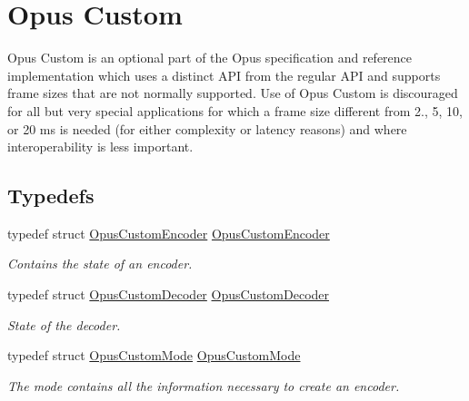 \hypertarget{group__opus__custom}{}\section{Opus Custom}
\label{group__opus__custom}


Opus Custom is an optional part of the Opus specification and reference implementation which uses a distinct A\+PI from the regular A\+PI and supports frame sizes that are not normally supported. Use of Opus Custom is discouraged for all but very special applications for which a frame size different from 2., 5, 10, or 20 ms is needed (for either complexity or latency reasons) and where interoperability is less important.  


\subsection*{Typedefs}
\begin{DoxyCompactItemize}
\item 
typedef struct \hyperlink{group__opus__custom_ga7abe6a7afc599667950251c987feb439}{Opus\+Custom\+Encoder} \hyperlink{group__opus__custom_ga7abe6a7afc599667950251c987feb439}{Opus\+Custom\+Encoder}
\begin{DoxyCompactList}\small\item\em Contains the state of an encoder. \end{DoxyCompactList}\item 
typedef struct \hyperlink{group__opus__custom_gacae60f89c5ce7aeea69503451b9e2e6f}{Opus\+Custom\+Decoder} \hyperlink{group__opus__custom_gacae60f89c5ce7aeea69503451b9e2e6f}{Opus\+Custom\+Decoder}
\begin{DoxyCompactList}\small\item\em State of the decoder. \end{DoxyCompactList}\item 
typedef struct \hyperlink{group__opus__custom_gaf33847c711195b9edef896b73c96ec4f}{Opus\+Custom\+Mode} \hyperlink{group__opus__custom_gaf33847c711195b9edef896b73c96ec4f}{Opus\+Custom\+Mode}
\begin{DoxyCompactList}\small\item\em The mode contains all the information necessary to create an encoder. \end{DoxyCompactList}\end{DoxyCompactItemize}
